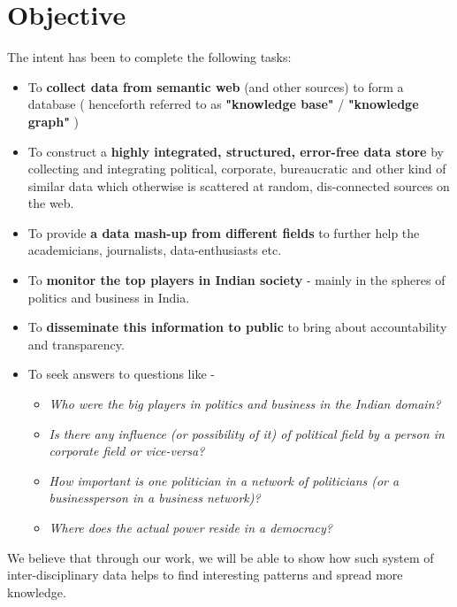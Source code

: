 \section{Objective}

The intent has been to complete the following tasks: 
\begin{itemize}


    \item To \textbf{collect data from semantic web} (and other sources) to form a database ( henceforth referred to as \textbf{"knowledge base"} / \textbf{"knowledge graph"} )
    
    \item To construct a \textbf{highly integrated, structured, error-free data store} by collecting and integrating political, corporate, bureaucratic and other kind of similar data which otherwise is scattered at random, dis-connected sources on the web.

    \item To provide \textbf{a data mash-up from different fields} to further help the academicians, journalists, data-enthusiasts etc.
    
    \item To \textbf{monitor the top players in Indian society} - mainly in the spheres of politics and business in India.
    
    \item To \textbf{disseminate this information to public} to bring about accountability and transparency. 
    
    \item  To seek answers to questions like -
        \begin{itemize}
         \item \emph{ Who were the big players in politics and business in the Indian domain? }
         \item \emph{ Is there any influence (or possibility of it) of political field by a person in corporate field or vice-versa? }
         \item \emph{ How important is one politician in a network of politicians (or a businessperson in a business network)? }
         \item \emph{ Where does the actual power reside in a democracy? }
        \end{itemize}
\end{itemize}
We believe that through our work, we will be able to show how such system of inter-disciplinary data helps to find interesting patterns and spread more knowledge.

